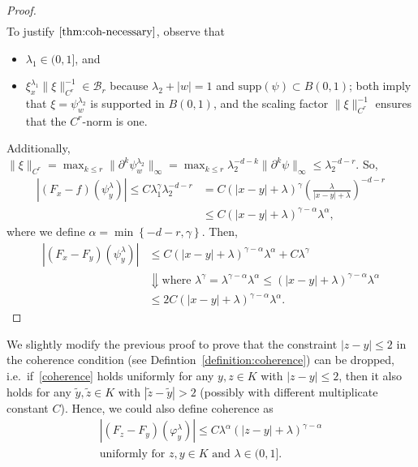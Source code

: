 \begin{proof}
\begin{align}
   \end{align}
   To justify \(\eqref{thm:coh-necessary}\), observe that 
   \begin{itemize}
       \item  \(\lambda_1 \in (0, 1]\), and 
       \item  \(\xi^{\lambda_1}_x \lVert \xi \rVert_{C^{r}}^{-1} \in \mathcal{B}_{r}\) because \(\lambda_2 + |w| = 1\) and \(\mathrm{supp}(\psi) \subset B(0,1)\); both imply that \(\xi = \psi^{\lambda_2}_w\) is supported in \(B(0,1)\), and the scaling factor \(\lVert \xi \rVert_{C^{r}}^{-1}\) ensures that the \(C^r\)-norm is one.
   \end{itemize}   
   Additionally, \(\lVert \xi \rVert_{C^{r}} = \max_{k \leq r}\lVert \partial^k \psi^{\lambda_2}_w \rVert_\infty = \max_{k \leq r} \lambda_2^{-d-k} \lVert \partial^k \psi \rVert_{\infty} \leq \lambda_2^{-d - r}\). So,
   \begin{align*}
    |(F_x - f)(\psi^\lambda_y)| \leq C\lambda_1^\gamma \lambda_2^{-d-r} &= C(|x-y| + \lambda)^\gamma\left(\frac{\lambda}{|x-y|  + \lambda}\right)^{-d-r} \\
    &\leq C  (|x-y| + \lambda)^{\gamma - \alpha} \lambda^\alpha,
   \end{align*}
    where we define \(\alpha = \min\left\{ -d-r , \gamma \right\}\). Then,
    \begin{align*}
        |(F_x - F_y)(\psi^\lambda_y)| &\leq C  (|x-y| + \lambda)^{\gamma - \alpha} \lambda^\alpha + C \lambda^\gamma \\
        &\Downarrow \text{where \(\lambda^\gamma = \lambda^{\gamma - \alpha} \lambda^\alpha \leq (|x-y| + \lambda)^{\gamma - \alpha} \lambda^\alpha\)} \\
        &\leq 2C  (|x-y| + \lambda)^{\gamma - \alpha} \lambda^\alpha.
    \end{align*}
\end{proof}

We slightly modify the previous proof to prove that the constraint \(|z-y| \leq 2\) in the coherence condition (see Defintion~\ref{definition:coherence}) can be dropped, i.e.\ if~\eqref{coherence} holds uniformly for any \(y,z \in K\) with \(|z-y| \leq 2\), then it also holds for any \(\tilde y, \tilde z \in K\) with \(|\tilde z- \tilde y| > 2\) (possibly with different multiplicate constant \(C\)). Hence, we could also define coherence as
\begin{gather}\label{better-coherence}
    |(F_z - F_y)(\varphi^\lambda_y)| \leq C\lambda^\alpha(|z-y| + \lambda)^{\gamma - \alpha}  \\ \text{uniformly for \(z,y \in K\) and \(\lambda \in (0,1]\)} \nonumber.
\end{gather}

